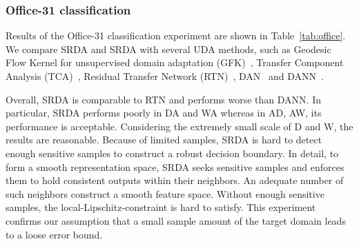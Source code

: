 \documentclass[journal,twocolumn]{IEEEtran}
\theoremstyle{definition}
\begin{document}
\subsubsection{Office-31 classification}
Results of the Office-31 classification experiment are shown in Table~\ref{tab:office}. We compare SRDA and SRDA with several UDA methods, such as Geodesic Flow Kernel for unsupervised domain adaptation (GFK)~\cite{gong2012geodesic}, Transfer Component Analysis (TCA)~\cite{pan2010domain}, Residual Transfer Network (RTN)~\cite{long2016unsupervised}, DAN~\cite{pmlr-v37-long15} and DANN~\cite{ganin2016domain}. 

Overall, SRDA is comparable to RTN and performs worse than DANN. In particular, SRDA performs poorly in DA and WA whereas in AD, AW, its performance is acceptable. Considering the extremely small scale of D and W, the results are reasonable. Because of limited samples, SRDA is hard to detect enough sensitive samples to construct a robust decision boundary. In detail, to form a smooth representation space, SRDA seeks sensitive samples and enforces them to hold consistent outputs within their neighbors. An adequate number of such neighbors construct a smooth feature space. Without enough sensitive samples, the local-Lipschitz-constraint is hard to satisfy. This experiment confirms our assumption that a small sample amount of the target domain leads to a loose error bound.

\begin{table}[htbp]
\centering
\caption{Classification accuracy percentage of Office-31 classification experiment among all four tasks. The first row corresponds to the performance if no adaption is implemented. We evaluate two SRDA models with different methods for adding noise. The results are cited from each study.}
\label{tab:office}
\end{table}
\end{document}
